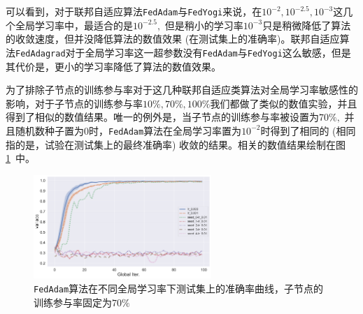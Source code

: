 可以看到，对于联邦自适应算法\texttt{FedAdam}与\texttt{FedYogi}来说，在$10^{-2}, 10^{-2.5}, 10^{-3}$这几个全局学习率中，最适合的是$10^{-2.5},$ 但是稍小的学习率$10^{-3}$只是稍微降低了算法的收敛速度，但并没降低算法的数值效果 (在测试集上的准确率)。联邦自适应算法\texttt{FedAdagrad}对于全局学习率这一超参数没有\texttt{FedAdam}与\texttt{FedYogi}这么敏感，但是其代价是，更小的学习率降低了算法的数值效果。

为了排除子节点的训练参与率对于这几种联邦自适应类算法对全局学习率敏感性的影响，对于子节点的训练参与率$10\%, 70\%, 100\%$我们都做了类似的数值实验，并且得到了相似的数值结果。唯一的例外是，当子节点的训练参与率被设置为$70\%,$ 并且随机数种子置为$0$时，\texttt{FedAdam}算法在全局学习率置为$10^{-2}$时得到了相同的 (相同指的是，试验在测试集上的最终准确率) 收敛的结果。相关的数值结果绘制在图\ref{fig:adam-sample-70-compare-lr-val-acc}~中。

\begin{figure}[ht]
    \centering
    \includegraphics[width=0.6\textwidth]{figures/adam-sample-70-compare-lr-val-acc.pdf}
    \caption{\texttt{FedAdam}算法在不同全局学习率下测试集上的准确率曲线，子节点的训练参与率固定为$70\%$}
    \label{fig:adam-sample-70-compare-lr-val-acc}
\end{figure}
